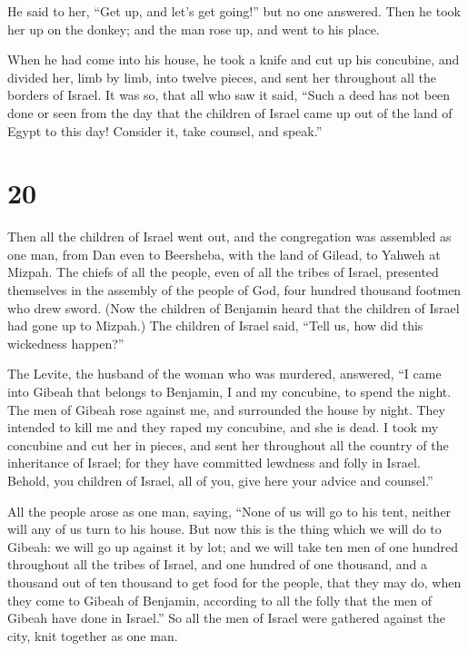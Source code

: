  He said to her, ``Get up, and let's get going!'' but no
one answered. Then he took her up on the donkey; and the man rose up,
and went to his place.

 When he had come into his house, he took a knife and cut
up his concubine, and divided her, limb by limb, into twelve pieces, and
sent her throughout all the borders of Israel.  It was
so, that all who saw it said, ``Such a deed has not been done or seen
from the day that the children of Israel came up out of the land of
Egypt to this day! Consider it, take counsel, and speak.''

\hypertarget{section-19}{%
\section{20}\label{section-19}}

 Then all the children of Israel went out, and the
congregation was assembled as one man, from Dan even to Beersheba, with
the land of Gilead, to Yahweh at Mizpah.  The chiefs of
all the people, even of all the tribes of Israel, presented themselves
in the assembly of the people of God, four hundred thousand footmen who
drew sword.  (Now the children of Benjamin heard that the
children of Israel had gone up to Mizpah.) The children of Israel said,
``Tell us, how did this wickedness happen?''

 The Levite, the husband of the woman who was murdered,
answered, ``I came into Gibeah that belongs to Benjamin, I and my
concubine, to spend the night.  The men of Gibeah rose
against me, and surrounded the house by night. They intended to kill me
and they raped my concubine, and she is dead.  I took my
concubine and cut her in pieces, and sent her throughout all the country
of the inheritance of Israel; for they have committed lewdness and folly
in Israel.  Behold, you children of Israel, all of you,
give here your advice and counsel.''

 All the people arose as one man, saying, ``None of us
will go to his tent, neither will any of us turn to his house.
 But now this is the thing which we will do to Gibeah: we
will go up against it by lot;  and we will take ten men
of one hundred throughout all the tribes of Israel, and one hundred of
one thousand, and a thousand out of ten thousand to get food for the
people, that they may do, when they come to Gibeah of Benjamin,
according to all the folly that the men of Gibeah have done in Israel.''
 So all the men of Israel were gathered against the city,
knit together as one man.

